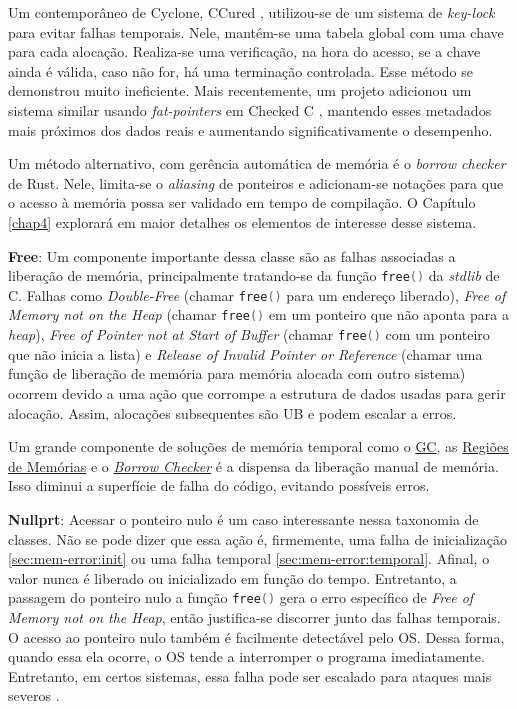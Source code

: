 \label{sec:mem-error:KeyLock}
Um contemporâneo de Cyclone, CCured \cite{CCURED}, utilizou-se de um sistema de \emph{key-lock} para evitar falhas temporais. Nele, mantém-se uma tabela global com uma chave para cada alocação. Realiza-se uma verificação, na hora do acesso, se a chave ainda é válida, caso não for, há uma terminação controlada. Esse método se demonstrou muito ineficiente. Mais recentemente, um projeto adicionou um sistema similar usando \emph{fat-pointers} em Checked C \cite{FATPOINTERS}, mantendo esses metadados mais próximos dos dados reais e aumentando significativamente o desempenho.

\label{sec:mem-error:BorrowChecker}
Um método alternativo, com gerência automática de memória é o \emph{borrow checker} de Rust. Nele, limita-se o \emph{aliasing} de ponteiros e adicionam-se notações para que o acesso à memória possa ser validado em tempo de compilação. O Capítulo \ref{chap4} explorará em maior detalhes os elementos de interesse desse sistema. 

\newcommand{\FREE}{\lstinline[language=C]|free()| }
\label{sec:mem-error:temporal:free}

\textbf{Free}: Um componente importante dessa classe são as falhas associadas a liberação de memória, principalmente tratando-se da função \FREE da \emph{stdlib} de C. Falhas como \emph{Double-Free} (chamar \FREE para um endereço liberado), \emph{Free of Memory not on the Heap} (chamar \FREE em um ponteiro que não aponta para a \emph{heap}), \emph{Free of Pointer not at Start of Buffer} (chamar \FREE com um ponteiro que não inicia a lista) e \emph{Release of Invalid Pointer or Reference} (chamar uma função de liberação de memória para memória alocada com outro sistema) ocorrem devido a uma ação que corrompe a estrutura de dados usadas para gerir alocação. Assim, alocações subsequentes são UB e podem escalar a erros.

Um grande componente de soluções de memória temporal como o \hyperref[sec:mem-error:GC]{GC}, as \hyperref[sec:mem-error:MemReg]{Regiões de Memórias} e o \hyperref[sec:mem-error:BorrowChecker]{\emph{Borrow Checker}} é a dispensa da liberação manual de memória. Isso diminui a superfície de falha do código, evitando possíveis erros.

\label{sec:mem-error:temporal:null}

\textbf{Nullprt}: Acessar o ponteiro nulo é um caso interessante nessa taxonomia de classes. Não se pode dizer que essa ação é, firmemente, uma falha de inicialização \ref{sec:mem-error:init} ou uma falha temporal \ref{sec:mem-error:temporal}. Afinal, o valor nunca é liberado ou inicializado em função do tempo. Entretanto, a passagem do ponteiro nulo a função \FREE gera o erro específico de \emph{Free of Memory not on the Heap}, então justifica-se discorrer junto das falhas temporais. O acesso ao ponteiro nulo também é facilmente detectável pelo OS. Dessa forma, quando essa ela ocorre, o OS tende a interromper o programa imediatamente. Entretanto, em certos sistemas, essa falha pode ser escalado para ataques mais severos \cite[p.4]{MemErrorPastPresentFuture}.

